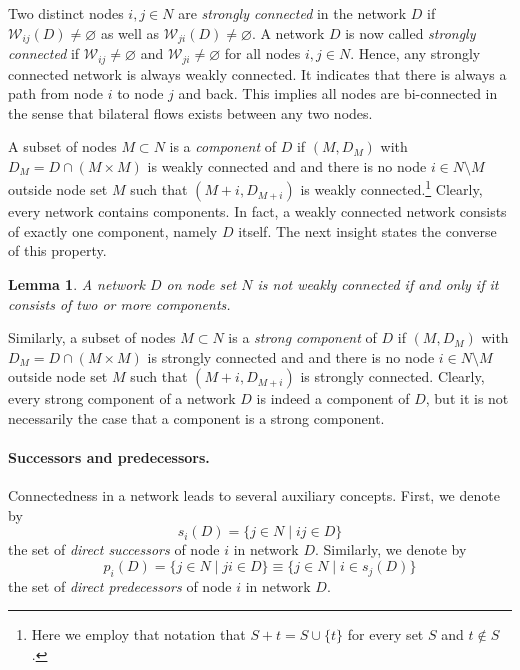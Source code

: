 \documentclass[11pt,fleqn]{article}
\newtheorem{lemma}[theorem]{Lemma}
\begin{document}
Two distinct nodes $i,j \in N$ are \textit{strongly connected} in the network $D$ if $\mathcal{W}_{ij}(D) \neq \varnothing$ as well as $\mathcal{W}_{ji}(D) \neq \varnothing$. A network $D$ is now called \emph{strongly connected} if $\mathcal{W}_{ij} \neq \varnothing$ and $\mathcal{W}_{ji} \neq \varnothing$ for all nodes $i,j \in N$. Hence, any strongly connected network is always weakly connected. It indicates that there is always a path from node $i$ to node $j$ and back. This implies all nodes are bi-connected in the sense that bilateral flows exists between any two nodes.

A subset of nodes $M \subset N$ is a \emph{component} of $D$ if $(M, D_M)$ with $D_M = D \cap (M \times M)$ is weakly connected and and there is no node $i \in N \setminus M$ outside node set $M$ such that $(M+i, D_{M+i})$ is weakly connected.\footnote{Here we employ that notation that $S+t = S \cup \{ t \}$ for every set $S$ and $t \notin S$.} Clearly, every network contains components. In fact, a weakly connected network consists of exactly one component, namely $D$ itself. The next insight states the converse of this property.
\begin{lemma}
	A network $D$ on node set $N$ is \emph{not} weakly connected if and only if it consists of two or more components.
\end{lemma}

\noindent
Similarly, a subset of nodes $M \subset N$ is a \emph{strong component} of $D$ if $(M, D_M)$ with $D_M = D \cap (M \times M)$ is strongly connected and and there is no node $i \in N \setminus M$ outside node set $M$ such that $(M+i, D_{M+i})$ is strongly connected. Clearly, every strong component of a network $D$ is indeed a component of $D$, but it is not necessarily the case that a component is a strong component.

\paragraph{Successors and predecessors.}

Connectedness in a network leads to several auxiliary concepts. First, we denote by
\begin{equation}
	s_i (D) = \{ j \in N \mid ij \in D \}
\end{equation}
the set of \emph{direct successors} of node $i$ in network $D$. Similarly, we denote by
\begin{equation}
	p_i (D) = \{ j \in N \mid ji \in D \} \equiv \{ j \in N \mid i \in s_j (D) \}
\end{equation}
the set of \emph{direct predecessors} of node $i$ in network $D$.
\end{document}
